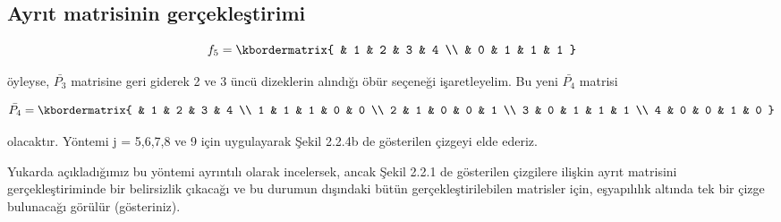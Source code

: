 \documentclass[11pt]{amsbook}
\begin{document}
\subsection{Ayrıt matrisinin gerçekleştirimi}


\renewcommand{\kbldelim}{[}%
\renewcommand{\kbrdelim}{]}%
\[
  \text{$f_5$} = \kbordermatrix{
    & 1 & 2 & 3 & 4 \\
    & 0 & 1 & 1 & 1 
  }
\]




öyleyse, $ \bar{P_3} $ matrisine geri giderek 2 ve 3 üncü dizeklerin alındığı \"{o}bür seçeneği işaretleyelim. Bu yeni $ \bar{P_4} $ matrisi


\renewcommand{\kbldelim}{[}%
\renewcommand{\kbrdelim}{]}%
\[
  \text{$ \bar{P_4}$} = \kbordermatrix{
    & 1 & 2 & 3 & 4 \\
    1 & 1 & 1 & 0 & 0 \\
    2 & 1 & 0 & 0 & 1 \\
    3 & 0 & 1 & 1 & 1 \\
    4 & 0 & 0 & 1 & 0 
  }
\]

olacaktır. Yöntemi j = 5,6,7,8 ve 9 için uygulayarak Şekil 2.2.4b de gösterilen çizgeyi elde ederiz. \par
Yukarda açıkladığımız bu yöntemi ayrıntılı olarak incelersek, ancak Şekil 2.2.1 de gösterilen çizgilere ilişkin ayrıt matrisini gerçekleştiriminde bir belirsizlik çıkacağı ve bu durumun dışındaki bütün gerçekleştirilebilen matrisler için, eşyapılılık altında tek bir çizge bulunacağı görülür (gösteriniz).
\end{document}
